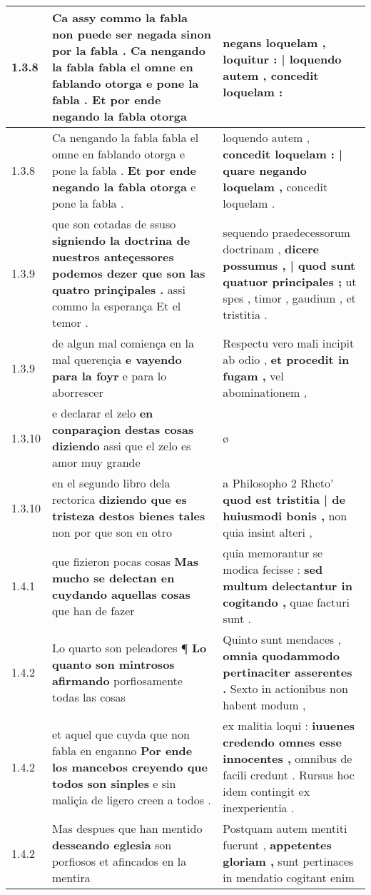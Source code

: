 \begin{tabular}{|p{1cm}|p{6.5cm}|p{6.5cm}|}
1.3.8 & Ca assy commo la fabla non puede ser negada sinon por la fabla . \textbf{ Ca nengando la fabla fabla el omne en fablando otorga e pone la fabla . } Et por ende negando la fabla otorga & negans loquelam , \textbf{ loquitur : | loquendo autem , } concedit loquelam : \\\hline
1.3.8 & Ca nengando la fabla fabla el omne en fablando otorga e pone la fabla . \textbf{ Et por ende negando la fabla otorga } e pone la fabla . & loquendo autem , \textbf{ concedit loquelam : | quare negando loquelam , } concedit loquelam . \\\hline
1.3.9 & que son cotadas de ssuso \textbf{ signiendo la doctrina de nuestros anteçessores podemos dezer que son las quatro prinçipales . } assi commo la esperança Et el temor . & sequendo praedecessorum doctrinam , \textbf{ dicere possumus , | quod sunt quatuor principales ; } ut spes , timor , gaudium , et tristitia . \\\hline
1.3.9 & de algun mal comiença en la mal querençia \textbf{ e vayendo para la foyr } e para lo aborrescer & Respectu vero mali incipit ab odio , \textbf{ et procedit in fugam , } vel abominationem , \\\hline
1.3.10 & e declarar el zelo \textbf{ en conparaçion destas cosas diziendo } assi que el zelo es amor muy grande & ø \\\hline
1.3.10 & en el segundo libro dela rectorica \textbf{ diziendo que es tristeza destos bienes tales } non por que son en otro & a Philosopho 2 Rheto’ \textbf{ quod est tristitia | de huiusmodi bonis , } non quia insint alteri , \\\hline
1.4.1 & que fizieron pocas cosas \textbf{ Mas mucho se delectan en cuydando aquellas cosas } que han de fazer & quia memorantur se modica fecisse : \textbf{ sed multum delectantur in cogitando , } quae facturi sunt . \\\hline
1.4.2 & Lo quarto son peleadores ¶ \textbf{ Lo quanto son mintrosos afirmando } porfiosamente todas las cosas & Quinto sunt mendaces , \textbf{ omnia quodammodo pertinaciter asserentes . } Sexto in actionibus non habent modum , \\\hline
1.4.2 & et aquel que cuyda que non fabla en enganno \textbf{ Por ende los mancebos creyendo que todos son sinples } e sin maliçia de ligero creen a todos . & ex malitia loqui : \textbf{ iuuenes credendo omnes esse innocentes , } omnibus de facili credunt . Rursus hoc idem contingit ex inexperientia . \\\hline
1.4.2 & Mas despues que han mentido \textbf{ desseando eglesia } son porfiosos et afincados en la mentira & Postquam autem mentiti fuerunt , \textbf{ appetentes gloriam , } sunt pertinaces in mendatio cogitant enim \\\hline

\end{tabular}
